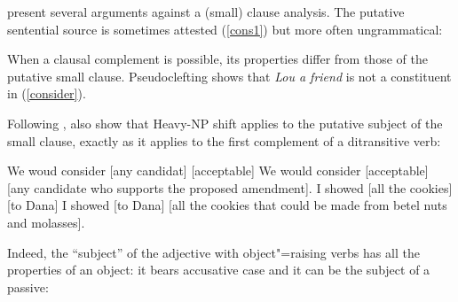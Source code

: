 \documentclass[output=paper
	        ,collection
	        ,collectionchapter
 	        ,biblatex
                ,babelshorthands
                ,newtxmath
                ,draftmode
                ,colorlinks, citecolor=brown
]{langscibook}
\begin{document}


\citet[Chapter~3]{PollardandSag1994} present several arguments against a (small) clause analysis. The putative sentential source is sometimes attested (\ref{cons1}) but more often ungrammatical:

	
\eal
{}
\zl

	
When a clausal complement is possible, its properties differ from those of the putative small clause. Pseudoclefting shows that \textit{Lou a friend} is not a constituent in (\ref{consider}).

\eal
{}
\zl

Following \citet{Bresnan1982}, \citet[113]{PollardandSag1994} also show that Heavy-NP shift applies to the putative subject of the small clause, exactly as it applies to the first complement of a ditransitive verb:

\begin{exe}
\ex \begin{xlist}
\ex   We woud consider [any candidat] [acceptable]
\ex We would consider [acceptable]  [any candidate who supports the proposed amendment].
\ex   I showed [all the cookies] [to Dana]
\ex I showed [to Dana]  [all the cookies that could be made from betel nuts and molasses].  
\end{xlist}

\end{exe}

 Indeed, the ``subject'' of the adjective with object"=raising verbs has all the properties of an
 object: it bears accusative case and it can be the subject of a passive:
\end{document}
